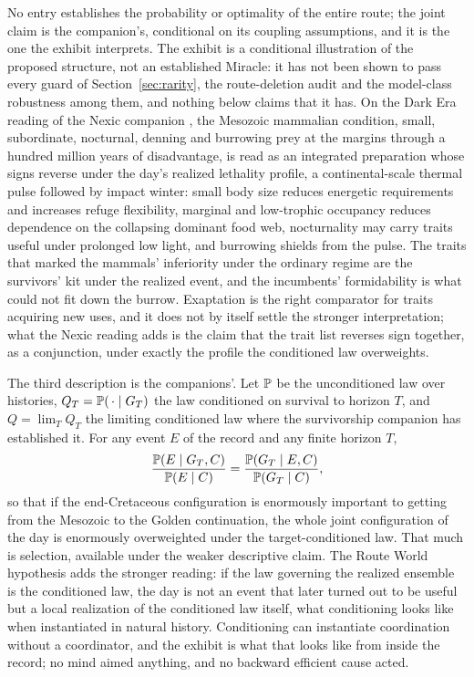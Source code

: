 \noindent No entry establishes the probability or optimality of the entire
route; the joint claim is the companion's, conditional on its coupling
assumptions, and it is the one the exhibit interprets. The exhibit is a
conditional illustration of the proposed structure, not an established
Miracle: it has not been shown to pass every guard of
Section~\ref{sec:rarity}, the route-deletion audit and the model-class
robustness among them, and nothing below claims that it has. On the Dark
Era reading of the Nexic companion \cite{Nexus}, the Mesozoic mammalian
condition, small, subordinate, nocturnal, denning and burrowing prey at the
margins through a hundred million years of disadvantage, is read as an
integrated preparation whose signs reverse under the day's realized lethality
profile, a continental-scale thermal pulse followed by impact winter: small
body size reduces energetic requirements and increases refuge flexibility,
marginal and low-trophic occupancy reduces dependence on the collapsing
dominant food web, nocturnality may carry traits useful under prolonged low
light, and burrowing shields from the pulse. The traits that marked the
mammals' inferiority under the ordinary regime are the survivors' kit under
the realized event, and the incumbents' formidability is what could not fit
down the burrow. Exaptation is the right comparator for traits acquiring new uses,
and it does not by itself settle the stronger interpretation; what the Nexic
reading adds is the claim that the trait list reverses sign together, as a
conjunction, under exactly the profile the conditioned law overweights.

The third description is the companions'. Let $\mathbb{P}$ be the
unconditioned law over histories, $Q_T=\mathbb{P}(\,\cdot\mid G_T)$ the law
conditioned on survival to horizon $T$, and $Q=\lim_TQ_T$ the limiting
conditioned law where the survivorship companion has established it. For any
event $E$ of the record and any finite horizon $T$,
\[
\frac{\mathbb{P}(E\mid G_T,C)}{\mathbb{P}(E\mid C)}=\frac{\mathbb{P}(G_T\mid E,C)}{\mathbb{P}(G_T\mid C)},
\]
so that if the end-Cretaceous configuration is enormously important to getting
from the Mesozoic to the Golden continuation, the whole joint configuration of
the day is enormously overweighted under the target-conditioned law. That much
is selection, available under the weaker descriptive claim. The Route World
hypothesis adds the stronger reading: if the law governing the realized
ensemble is the conditioned law, the day is not an event that later turned
out to be useful but a local realization of the conditioned law itself, what
conditioning looks like when instantiated in natural history. Conditioning can
instantiate coordination without a coordinator, and the exhibit is what that
looks like from inside the record; no mind aimed anything, and no backward
efficient cause acted.

